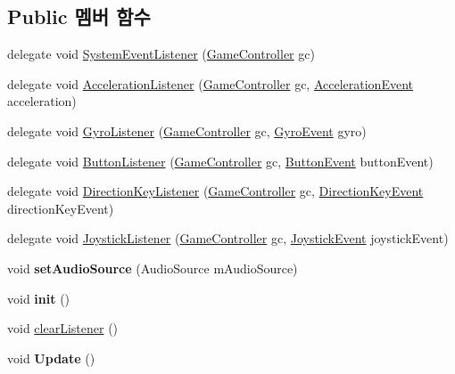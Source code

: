 \subsection*{Public 멤버 함수}
\begin{DoxyCompactItemize}
\item 
delegate void \hyperlink{class_event_manager_a65e017fcb7c22959f09becc40ad3bc2d}{System\+Event\+Listener} (\hyperlink{class_game_controller}{Game\+Controller} gc)
\item 
delegate void \hyperlink{class_event_manager_ac459bcb4ba4f140243e271628f8d366c}{Acceleration\+Listener} (\hyperlink{class_game_controller}{Game\+Controller} gc, \hyperlink{class_event_manager_1_1_acceleration_event}{Acceleration\+Event} acceleration)
\item 
delegate void \hyperlink{class_event_manager_a4ed9f5be26f2015a5cc107257f02eff8}{Gyro\+Listener} (\hyperlink{class_game_controller}{Game\+Controller} gc, \hyperlink{class_event_manager_1_1_gyro_event}{Gyro\+Event} gyro)
\item 
delegate void \hyperlink{class_event_manager_ae17715b9a94a50d9a8e1f29580af7c16}{Button\+Listener} (\hyperlink{class_game_controller}{Game\+Controller} gc, \hyperlink{class_event_manager_1_1_button_event}{Button\+Event} button\+Event)
\item 
delegate void \hyperlink{class_event_manager_a3bcc7e1ecc58c1625fb107ce4fe6feaa}{Direction\+Key\+Listener} (\hyperlink{class_game_controller}{Game\+Controller} gc, \hyperlink{class_event_manager_1_1_direction_key_event}{Direction\+Key\+Event} direction\+Key\+Event)
\item 
delegate void \hyperlink{class_event_manager_ad470a4c2e411d814dd480043332f2a70}{Joystick\+Listener} (\hyperlink{class_game_controller}{Game\+Controller} gc, \hyperlink{class_event_manager_1_1_joystick_event}{Joystick\+Event} joystick\+Event)
\item 
\hypertarget{class_event_manager_ac6cc5e4abf6c77869e47e10c777435b0}{}void {\bfseries set\+Audio\+Source} (Audio\+Source m\+Audio\+Source)\label{class_event_manager_ac6cc5e4abf6c77869e47e10c777435b0}

\item 
\hypertarget{class_event_manager_a87a500cb834a14e7e42a4c93cd95c49c}{}void {\bfseries init} ()\label{class_event_manager_a87a500cb834a14e7e42a4c93cd95c49c}

\item 
void \hyperlink{class_event_manager_a1a5bf8b2520c7ce2a1c6b8c54f1974e4}{clear\+Listener} ()
\item 
\hypertarget{class_event_manager_a78838eb337e993284fa0e392db468919}{}void {\bfseries Update} ()\label{class_event_manager_a78838eb337e993284fa0e392db468919}


\end{DoxyCompactItemize}
